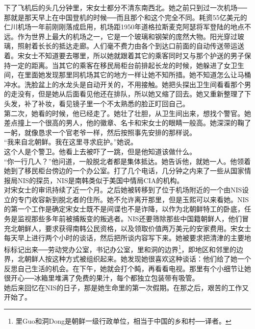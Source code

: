下了飞机后的头几分钟里，宋女士都分不清东南西北。她之前只到过一次机场──那就是那天早上在中国登机的时候──而且那个和这个完全不同。耗资55亿美元的仁川机场一年前刚刚落成启用，机场距1950年道格拉斯麦克阿瑟将军登陆的地点不远。作为世界上最大的机场之一，它是一个玻璃和钢架的庞然大物。阳光穿过玻璃，照射着长长的抵达走廊。人们毫不费力由各个到达口前面的自动传送带运送着。宋女士不知道要去哪里，所以她就跟着其它的乘客同时又与那个护送的男子保持一定的距离。当其它的乘客在移民局柜台前排起长龙的时候，她躲进了女卫生间，在里面她发现那里同机场其它的地方一样让她不知所措。她不知道怎么让马桶冲水。洗脸盆上的水龙头是自动开关的，不用接触。她把头探出卫生间看看那个男的走没有，但是她从后面看见他还在排队，所以她又缩了回去。她又重新整理了下头发，补了补妆，看见镜子里一个不太熟悉的脸正盯回自己。\\

第二次，她看的时候，他已经走了。她壮了壮胆，从卫生间出来，想找个警官。她差点撞上一个很高的男人，他的徽章、名卡和宋女士的眼睛一般高。她深深的鞠了一躬，就像恳求一个官老爷一样，然后按照事先安排的那样说。\\

“我来自北朝鲜。我在这里寻求庇护。”她说。\\

这个人是个警卫。他看上去被吓了一跳，但是他知道该做什么。\\

“你一行几人？”他问道，一般脱北者都是集体抵达。她告诉他，就她一人。他领着她到了移民柜台傍边的一个办公室。打了几个电话，几分钟之内来了一些从国家情报局NIS的探员，NIS是南韩类似于美国中情局CIA的机构。\\

对宋女士的审讯持续了近一个月。之后她被转移到了位于机场附近的一个由NIS设立的专门收容新到脱北者的住所。她不允许离开那里，但是玉熙可以来看她。NIS的第一个工作是确定宋女士既不是间谍也不是诈降，以作为北朝鲜特工的卧底，任务是监视那些多年前被捕叛变的叛逃者。NIS还要筛除那些中国籍朝鲜人，他们冒充北朝鲜人，要求获得南韩公民资格，以及领取价值两万美元的安家费用。宋女士每天早上进行两个小时的谈话，然后把所谈内容写下来。她被要求把清津的主要地标标记出来──劳动党办公室，书记办公室，里和洞的边界\footnote{里Guo和洞Dong是朝鲜一级行政单位，相当于中国的乡和村──译者。}，即地区和邻里的边界，北朝鲜人按这种方式被组织起来。她发现她很喜欢这种谈话：他们给了她一个反思自己生活的机会。在下午，她就会打个盹，再看看电视。那里有个小细节让她很开心──冰箱里堆满了免费的果汁，每个都独立包装带有吸管。\\

她后来回忆在NIS的日子，那是她生命里的第一次假期。在那之后，艰苦的工作又开始了。\\

